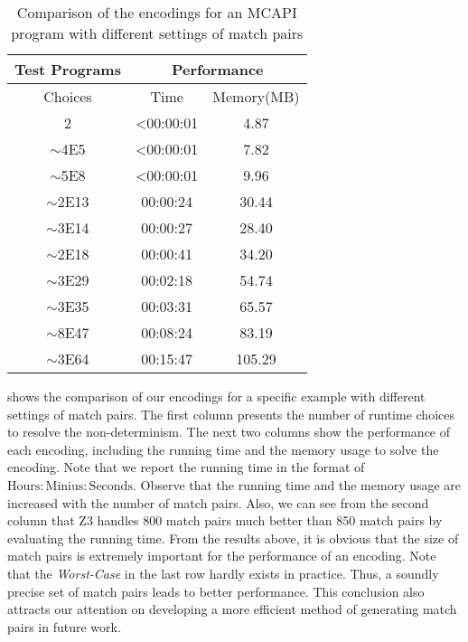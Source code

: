 \begin{table}
\begin{center}
\scriptsize
\begin{tabular}{|c|c|c|}
		\hline
         \multicolumn{1}{|c|}{Test Programs} & \multicolumn{2}{|c|}{Performance} \\ \hline
          Choices &  Time & Memory(MB) \\ \hline
           2 & <00:00:01 & 4.87 \\
           $\sim$4E5 &  <00:00:01 & 7.82 \\
           $\sim$5E8 &  <00:00:01 & 9.96 \\
           $\sim$2E13 &  00:00:24 & 30.44 \\
           $\sim$3E14 &  00:00:27 & 28.40 \\
            $\sim$2E18 &  00:00:41 & 34.20 \\
          $\sim$3E29 &  00:02:18 & 54.74 \\
          $\sim$3E35 &  00:03:31 & 65.57 \\
          $\sim$8E47 &  00:08:24 & 83.19 \\
          $\sim$3E64 &  00:15:47 & 105.29 \\
         \hline
		\end{tabular}
\end{center}
\caption{Comparison of the encodings for an MCAPI program with different settings of match pairs}
\label{table:first}
\end{table}

 shows the comparison of our encodings for a specific example with different settings of match pairs. The first column presents the number of runtime choices to resolve the non-determinism. The next two columns show the performance of each encoding, including the running time and the memory usage to solve the encoding. Note that we report the running time in the format of $\mathrm{Hours:Minius:Seconds}$. Observe that the running time and the memory usage are increased with the number of match pairs. Also, we can see from the second column that Z3 handles 800 match pairs much better than 850 match pairs by evaluating the running time. From the results above, it is obvious that the size of match pairs is extremely important for the performance of an encoding. Note that the \textit{Worst-Case} in the last row hardly exists in practice. Thus, a soundly precise set of match pairs leads to better performance. This conclusion also attracts our attention on developing a more efficient method of generating match pairs in future work.


